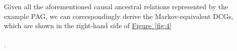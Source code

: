 \documentclass[twoside, 11pt]{article}
\newcommand{\stararrow}{%
\begin{tikzpicture}
    \draw [{Rays[n=6]}-{Straight Barb[length=2.5pt]}] (0,0) -- (0.5, 0);
\end{tikzpicture}
}
\newcommand{\tailcirc}{%
\begin{tikzpicture}[baseline=-3pt] 
    \draw [-{Circle[open]}] (0,0) -- (0.4, 0);
\end{tikzpicture}
}
\newcommand{\tailstar}{%
\begin{tikzpicture}[baseline=-3pt] 
    \draw [-{Rays[n=6]}] (0,0) -- (0.5, 0);
\end{tikzpicture}
}
\newcommand{\tailarrow}{%
\begin{tikzpicture}
    \draw [-{Straight Barb[length=2.5pt]}](0,0) -- (0.4, 0);
\end{tikzpicture}
}
\newcommand*{\figref}[2][]{%
  \hyperref[{fig:#2}]{%
    Figure~\ref*{fig:#2}%
    \ifx\\#1\\%
    \else
      #1%
    \fi
  }%
}
\newtheorem{definition}{Definition}
\begin{document}
\noindent Given all the aforementioned causal ancestral relations represented by the example PAG, we can correspondingly derive the Markov-equivalent DCGs, which are shown in the right-hand side of \figref[]{4}.






    

\end{document}
